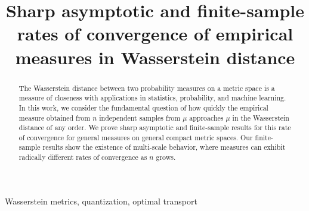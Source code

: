 \documentclass[sts]{imsart}
\begin{document}
\begin{frontmatter}
\title{Sharp asymptotic and finite-sample rates of convergence of empirical measures in Wasserstein distance}


\begin{abstract}
The Wasserstein distance between two probability measures on a metric space is a measure of closeness with applications in statistics, probability, and machine learning.
In this work, we consider the fundamental question of how quickly the empirical measure obtained from $n$ independent samples from $\mu$ approaches $\mu$ in the Wasserstein distance of any order.
We prove sharp asymptotic and finite-sample results for this rate of convergence for general measures on general compact metric spaces.
Our finite-sample results show the existence of multi-scale behavior, where measures can exhibit radically different rates of convergence as $n$ grows.
\end{abstract}
\begin{keyword}[class=KWD]
Wasserstein metrics, quantization, optimal transport
\end{keyword}
\end{frontmatter}
\end{document}
